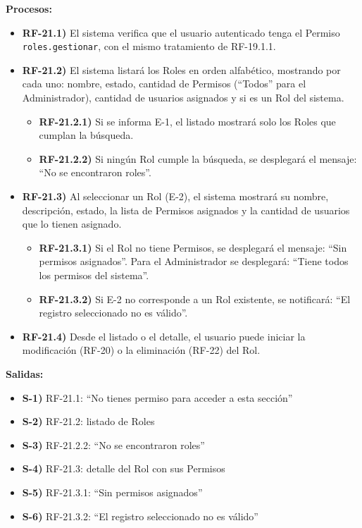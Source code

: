 \textbf{Procesos:}
\begin{itemize}[label={}, leftmargin=1.5em]
  \item \textbf{RF-21.1)} El sistema verifica que el usuario autenticado tenga el Permiso \texttt{roles.gestionar}, con el mismo tratamiento de RF-19.1.1.
  \item \textbf{RF-21.2)} El sistema listar\'a los Roles en orden alfab\'etico, mostrando por cada uno: nombre, estado, cantidad de Permisos (``Todos'' para el Administrador), cantidad de usuarios asignados y si es un Rol del sistema.
  \begin{itemize}[label={}, leftmargin=1.5em]
    \item \textbf{RF-21.2.1)} Si se informa E-1, el listado mostrar\'a solo los Roles que cumplan la b\'usqueda.
    \item \textbf{RF-21.2.2)} Si ning\'un Rol cumple la b\'usqueda, se desplegar\'a el mensaje: ``No se encontraron roles''.
  \end{itemize}
  \item \textbf{RF-21.3)} Al seleccionar un Rol (E-2), el sistema mostrar\'a su nombre, descripci\'on, estado, la lista de Permisos asignados y la cantidad de usuarios que lo tienen asignado.
  \begin{itemize}[label={}, leftmargin=1.5em]
    \item \textbf{RF-21.3.1)} Si el Rol no tiene Permisos, se desplegar\'a el mensaje: ``Sin permisos asignados''. Para el Administrador se desplegar\'a: ``Tiene todos los permisos del sistema''.
    \item \textbf{RF-21.3.2)} Si E-2 no corresponde a un Rol existente, se notificar\'a: ``El registro seleccionado no es v\'alido''.
  \end{itemize}
  \item \textbf{RF-21.4)} Desde el listado o el detalle, el usuario puede iniciar la modificaci\'on (RF-20) o la eliminaci\'on (RF-22) del Rol.
\end{itemize}

\textbf{Salidas:}
\begin{itemize}[label={}, leftmargin=1.5em]
  \item \textbf{S-1)} RF-21.1: ``No tienes permiso para acceder a esta secci\'on''
  \item \textbf{S-2)} RF-21.2: listado de Roles
  \item \textbf{S-3)} RF-21.2.2: ``No se encontraron roles''
  \item \textbf{S-4)} RF-21.3: detalle del Rol con sus Permisos
  \item \textbf{S-5)} RF-21.3.1: ``Sin permisos asignados''
  \item \textbf{S-6)} RF-21.3.2: ``El registro seleccionado no es v\'alido''
\end{itemize}

